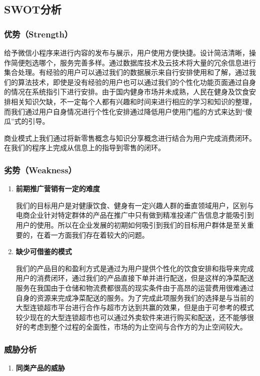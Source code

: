 \documentclass[UTF8,12pt]{ctexart}
\numberwithin{figure}{section}%
\begin{document}
\begin{spacing}{2}
\subsection{SWOT分析}
\subsubsection{优势（Strength）}
给予微信小程序来进行内容的发布与展示，用户使用方便快捷。设计简洁清晰，操作简便剋选哪个，服务完善多样。通过数据库技术及云技术将大量的冗余信息进行集合处理。有经验的用户可以通过我们的数据展示来自行安排使用和了解，通过我们的算法技术，即使是没有经验的用户也可以通过我们的个性化功能页面通过自身的情况在系统指引下进行安排。由于国内健身市场并未成熟，人民在健身及饮食安排相关知识欠缺，不一定每个人都有兴趣和时间来进行相应的学习和知识的整理，而我们通过用户自身情况进行个性化安排通过降低用户使用门槛的方式来达到“傻瓜”式的引导。

商业模式上我们通过将新零售概念与知识分享概念进行结合为用户完成消费闭环。在我们的程序上完成从信息上的指导到零售的闭环。
\subsubsection{劣势（Weakness）}
\begin{enumerate}
	\item[(1)] \textbf{前期推广营销有一定的难度 }
	
	\setlength{\parindent}{2em}我们的目标用户是对健康饮食、健身有一定兴趣人群的垂直领域用户，区别与电商企业针对特定群体的产品在推广中只有做到精准投递广告信息才能吸引到用户的使用。所以在企业发展的初期如何吸引到我们的目标用户群体是至关重要的，在着一方面我们存在着较大的问题。
	
	\item[(2)] \textbf{缺少可借鉴的模式 }	
	
	\setlength{\parindent}{2em}我们的产品目的和盈利方式是通过为用户提供个性化的饮食安排和指导来完成用户的消费闭环，通过我们的产品直接下单并进行配送，但是这样的净菜配送服务在我国由于仓储和物流费都很高的现实条件由于高昂的运营费用很难通过自身的资源来完成净菜配送的服务。为了完成此项服务我们的选择是与当前的大型连锁超市平台进行合作与超市方达到共赢的效果，但是由于可参考的模式较少现在的大型连锁超市也可以通过外卖软件来进行购买和配送，还不能够很好的考虑到整个过程的全面性，市场的为止空间与合作方的为止空间较大。

\end{enumerate}

\subsubsection{威胁分析}
\begin{enumerate}
	\item[(1)] \textbf{同类产品的威胁}
	

\end{enumerate}
\end{spacing}
\end{document}
